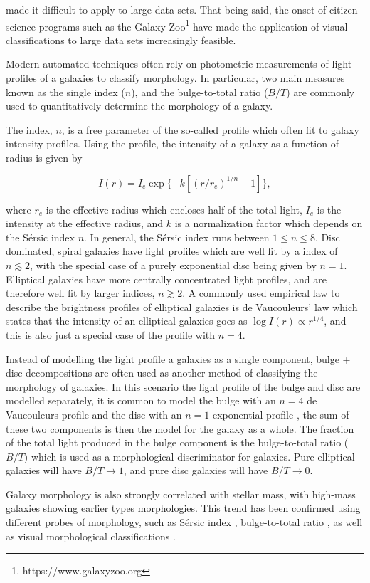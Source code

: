 made it difficult to apply to large data sets.  That being said, the
onset of citizen science programs such as the Galaxy
Zoo\footnote{https://www.galaxyzoo.org} \citep{lintott2008} have made
the application of visual classifications to large data sets
increasingly feasible.
\par
Modern automated techniques often rely on photometric measurements of 
light profiles of a galaxies to classify morphology.  In particular, two
main measures known as the single \ser index ($n$), and the
bulge-to-total ratio ($B/T$) are commonly used to quantitatively determine
the morphology of a galaxy.
\par
The \ser index, $n$, is a free parameter of the so-called
\ser profile \citep{sersic1968} which often fit to galaxy
intensity profiles.  Using the \ser profile, the intensity of a
galaxy as a function of radius is given by 

\begin{equation}
  I(r) = I_e \exp \{-k [(r/r_e)^{1/n} - 1]\},
\end{equation}

\noindent
where $r_e$ is the effective radius which encloses half of the total
light, $I_e$ is the intensity at the effective radius, and $k$ is a
normalization factor which depends on the S{\'e}rsic index $n$.  In
general, the S{\'e}rsic index runs between $1 \le n \le 8$.  Disc
dominated, spiral galaxies have light profiles which are well fit by a
\ser index of $n \lesssim 2$, with the special case of a purely
exponential disc being given by $n=1$.  Elliptical galaxies have more
centrally concentrated light profiles, and are therefore well fit by
larger \ser indices, $n \gtrsim 2$.  A commonly used empirical law to
describe the brightness profiles of elliptical galaxies is de
Vaucouleurs' law which states that the intensity of an elliptical
galaxies goes as $\log I(r) \propto r^{1/4}$, and this is also just a
special case of the \ser profile with $n=4$.
\par
Instead of modelling the light profile a galaxies as a single
component, bulge + disc decompositions are often used as another
method of classifying the morphology of galaxies.  In this scenario
the light profile of the bulge and disc are modelled separately, it is
common to model the bulge with an $n=4$ de Vaucouleurs profile and the
disc with an $n=1$ exponential profile \citep[e.g.][]{simard2002}, the
sum of these two
components is then the model for the galaxy as a whole.  The fraction
of the total light produced in the bulge component is the bulge-to-total ratio
($B/T$) which is used as a morphological discriminator for galaxies.
Pure elliptical galaxies will have $B/T \to 1$, and pure disc galaxies
will have $B/T \to 0$.
\par
Galaxy morphology is also strongly correlated with stellar mass, with
high-mass galaxies showing earlier types morphologies.  This trend has
been confirmed using different probes of morphology, such as
S{\'e}rsic index \citep{vanderwel2008}, bulge-to-total ratio
\citep{bluck2014}, as well as visual morphological classifications
\citep{bamford2009}.  

